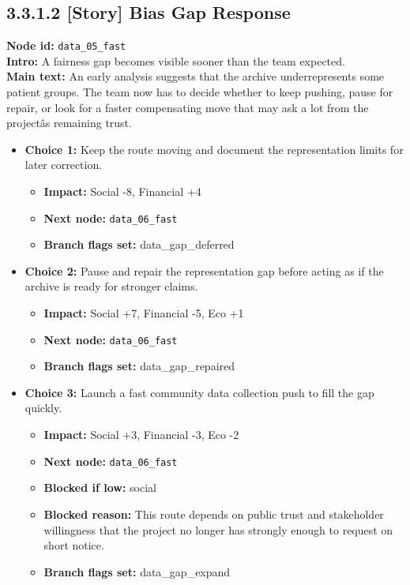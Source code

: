 \documentclass[11pt]{article}
\begin{document}
\subsection*{3.3.1.2 [Story] Bias Gap Response}
\textbf{Node id:} \texttt{data\_05\_fast}\\
\textbf{Intro:} A fairness gap becomes visible sooner than the team expected.\\
\textbf{Main text:} An early analysis suggests that the archive underrepresents some patient groups. The team now has to decide whether to keep pushing, pause for repair, or look for a faster compensating move that may ask a lot from the projectâs remaining trust.\\
\begin{itemize}
\item \textbf{Choice 1:} Keep the route moving and document the representation limits for later correction.
\begin{itemize}
\item \textbf{Impact:} Social -8, Financial +4
\item \textbf{Next node:} \texttt{data\_06\_fast}
\item \textbf{Branch flags set:} data\_gap\_deferred
\end{itemize}
\item \textbf{Choice 2:} Pause and repair the representation gap before acting as if the archive is ready for stronger claims.
\begin{itemize}
\item \textbf{Impact:} Social +7, Financial -5, Eco +1
\item \textbf{Next node:} \texttt{data\_06\_fast}
\item \textbf{Branch flags set:} data\_gap\_repaired
\end{itemize}
\item \textbf{Choice 3:} Launch a fast community data collection push to fill the gap quickly.
\begin{itemize}
\item \textbf{Impact:} Social +3, Financial -3, Eco -2
\item \textbf{Next node:} \texttt{data\_06\_fast}
\item \textbf{Blocked if low:} social
\item \textbf{Blocked reason:} This route depends on public trust and stakeholder willingness that the project no longer has strongly enough to request on short notice.
\item \textbf{Branch flags set:} data\_gap\_expand
\end{itemize}
\end{itemize}
\end{document}
